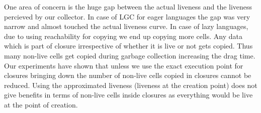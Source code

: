 \documentclass[9pt]{sigplanconf}
\newcommand{\comment}[1]{{\color{Myblue}{(#1)}}}
\begin{document}
One area  of concern is the  huge gap between the  actual liveness and
the liveness  percieved by  our collector.  In case  of LGC  for eager
languages  the gap  was  very  narrow and  almost  touched the  actual
liveness curve.  In case of  lazy languages, due to using reachability
for copying we  end up copying more  cells. Any data which  is part of
closure irrespective  of whether it is  live or not gets  copied. Thus
many non-live  cells get  copied during garbage  collection increasing
the drag  time.  Our  experiments have  shown that  unless we  use the
exact  execution  point  for  closures bringing  down  the  number  of
non-live  cells  copied in  closures  cannot  be reduced.   Using  the
approximated liveness (liveness  at the creation point)  does not give
benefits  in terms  of non-live  cells inside  closures as  everything
would be live at the point of creation.
\end{document}
